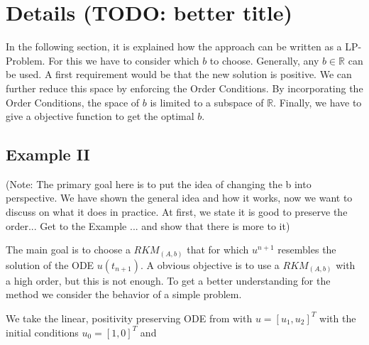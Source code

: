 \documentclass[a4paper]{scrartcl}
\numberwithin{equation}{section}
\theoremstyle{plain}
\theoremstyle{definition}
\numberwithin{theorem}{section}
\newcommand{\R}{\mathbb{R}}
\newcommand{\1}{\mathbbm{1}}
\begin{document}
\section{Details (TODO: better title)}\label{sec:LP-Problem}

In the following section, it is explained how the approach can be written as a LP-Problem. 
For this we have to consider which $b$ to choose. 
Generally, any $b \in \R$ can be used. 
A first requirement would be that the new solution is positive.
We can further reduce this space by enforcing the Order Conditions. 
By incorporating the Order Conditions, the space of $b$ is limited to a subspace of $\R$. %
Finally, we have to give a objective function to get the optimal $b$.


\subsection{Example II}\label{sec:example_lin}

(Note: The primary goal here is to put the idea of changing the b into perspective. We have shown the general idea and how it works, now we want to discuss on what it does in practice. At first, we state it is good to preserve the order... Get to the Example ... and show that there is more to it)


The main goal is to choose a $RKM_{(A,b)}$ that for which $u^{n+1}$ resembles the solution of the ODE $u(t_{n+1})$. 
A obvious objective is to use a $RKM_{(A,b)}$ with a high order, but this is not enough.
To get a better understanding for the method we consider the behavior of a simple problem.   

We take the linear, positivity preserving ODE from \cite{kopecz_unconditionally_2018} with $u = [u_1,u_2]^T$ with the initial conditions $u_0 = [1,0]^T$ and
\end{document}
